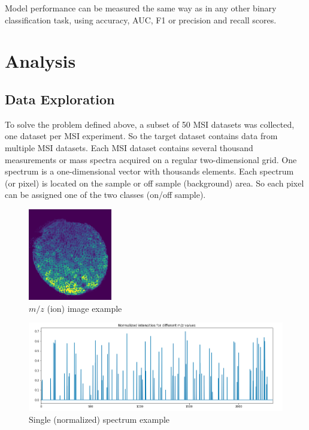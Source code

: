 \documentclass[a4paper]{article}
\begin{document}
Model performance can be measured the same way as in any other binary classification task,
using accuracy, AUC, F1 or precision and recall scores.

\pagebreak
\section*{Analysis}

\subsection*{Data Exploration}

To solve the problem defined above, a subset of 50 MSI datasets was collected, one dataset per
MSI experiment. So the target dataset contains data from multiple MSI datasets.
Each MSI dataset contains several
thousand measurements or mass spectra acquired on a regular two-dimensional grid. One spectrum is
a one-dimensional vector with thousands elements. Each spectrum (or pixel) is located on the sample
or off sample (background) area. So each pixel can be assigned one of the two classes (on/off sample).

\begin{figure}[H]
    \centering
        \includegraphics[width=\textwidth,height=4cm,keepaspectratio]{ion_image_2.png}
    \caption{$m/z$ (ion) image example}
\end{figure}

\begin{figure}[H]
    \centering
        \includegraphics[width=1.\textwidth]{spectrum_graph_1.png}
    \caption{Single (normalized) spectrum example}
\end{figure}
\end{document}
